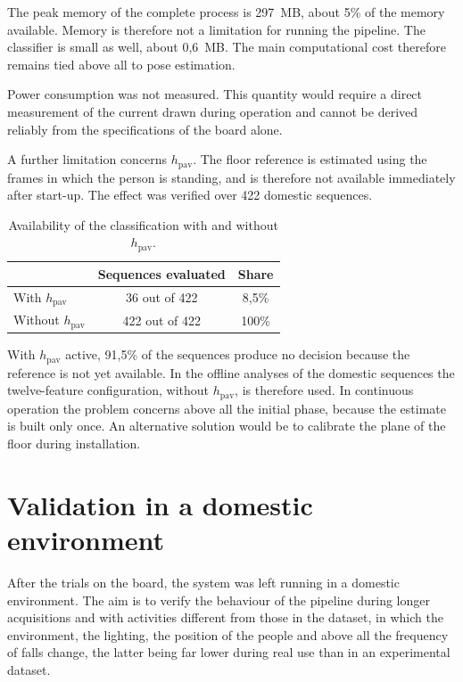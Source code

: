 The peak memory of the complete process is 297~MB, about 5\% of the memory available. Memory is therefore not a limitation for running the pipeline. The classifier is small as well, about 0,6~MB. The main computational cost therefore remains tied above all to pose estimation.

Power consumption was not measured. This quantity would require a direct measurement of the current drawn during operation and cannot be derived reliably from the specifications of the board alone.

A further limitation concerns $h_{\text{pav}}$. The floor reference is estimated using the frames in which the person is standing, and is therefore not available immediately after start-up. The effect was verified over 422 domestic sequences.

\begin{table}[H]
\centering
\caption{Availability of the classification with and without $h_{\text{pav}}$.}
\label{tab:pavimento_disponibilita}
\begin{tabular}{lcc}
\toprule
{} & \textbf{Sequences evaluated} & \textbf{Share} \\
\midrule
With $h_{\text{pav}}$ & 36 out of 422 & 8,5\% \\
Without $h_{\text{pav}}$ & 422 out of 422 & 100\% \\
\bottomrule
\end{tabular}
\end{table}

With $h_{\text{pav}}$ active, 91,5\% of the sequences produce no decision because the reference is not yet available. In the offline analyses of the domestic sequences the twelve-feature configuration, without $h_{\text{pav}}$, is therefore used. In continuous operation the problem concerns above all the initial phase, because the estimate is built only once. An alternative solution would be to calibrate the plane of the floor during installation.

\section{Validation in a domestic environment}
\label{sec:campo}

After the trials on the board, the system was left running in a domestic environment. The aim is to verify the behaviour of the pipeline during longer acquisitions and with activities different from those in the dataset, in which the environment, the lighting, the position of the people and above all the frequency of falls change, the latter being far lower during real use than in an experimental dataset.

